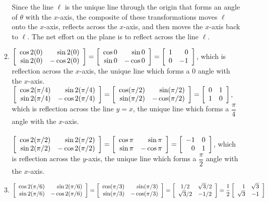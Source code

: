 \begin{enumerate}[!HW!, start=1]
\begin{enumerate}
Since the line $\ell$ is the unique line through the origin that forms an angle of $\theta$ with the $x$-axis, the composite of these transformations moves $\ell$ onto the $x$-axis, reflects across the $x$-axis, and then moves the $x$-axis back to $\ell$. The net effort on the plane is to reflect across the line $\ell$.\\ 
\item $ \mtx{rr}{\cos 2(0) & \sin 2(0) \\ \sin 2(0) & -\cos 2(0)} =  \mtx{rr}{\cos 0 & \sin 0 \\ \sin 0 & -\cos 0} = \mtx{rr}{1 & 0 \\ 0 & -1}$, which is reflection across the $x$-axis, the unique line which forms a $0$ angle with the $x$-axis.\\
$ \mtx{rr}{\cos 2(\pi/4) & \sin 2(\pi/4) \\ \sin 2(\pi/4) & -\cos 2(\pi/4)} =  \mtx{rr}{\cos (\pi/2) & \sin (\pi/2) \\ \sin (\pi/2) & -\cos (\pi/2)} = \mtx{rr}{0 & 1 \\ 1 & 0}$, which is reflection across the line $y=x$, the unique line which forms a $\dfrac{\pi}{4}$ angle with the $x$-axis.\\\\
$ \mtx{rr}{\cos 2(\pi/2) & \sin 2(\pi/2) \\ \sin 2(\pi/2) & -\cos 2(\pi/2)} =  \mtx{rr}{\cos \pi & \sin \pi \\ \sin \pi & -\cos \pi} = \mtx{rr}{-1 & 0 \\ 0 & 1}$, which is reflection across the $y$-axis, the unique line which forms a $\dfrac{\pi}{2}$ angle with the $x$-axis.\\
\item $ \mtx{rr}{\cos 2(\pi/6) & \sin 2(\pi/6) \\ \sin 2(\pi/6) & -\cos 2(\pi/6)} =  \mtx{rr}{\cos (\pi/3) & \sin (\pi/3) \\ \sin (\pi/3) & -\cos (\pi/3)} = \mtx{cc}{1/2 & \sqrt{3}/2 \\ \sqrt{3}/2 & -1/2} = \dfrac{1}{2}\mtx{rr}{1 & \sqrt{3} \\ \sqrt{3} & -1}$
\begin{center}
\end{center}
\end{enumerate}
\end{enumerate}
